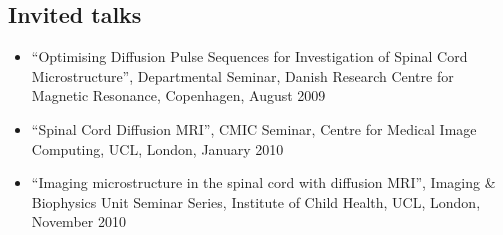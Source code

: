 \subsection*{Invited talks}
\begin{itemize}
  \item ``Optimising Diffusion Pulse Sequences for Investigation of Spinal Cord Microstructure'', Departmental Seminar, Danish Research Centre for Magnetic Resonance, Copenhagen, August 2009
  \item ``Spinal Cord Diffusion MRI'', CMIC Seminar, Centre for Medical Image Computing, UCL, London, January 2010
  \item ``Imaging microstructure in the spinal cord with diffusion MRI'', Imaging \& Biophysics Unit Seminar Series, Institute of Child Health, UCL, London, November 2010   
\end{itemize}


 
 
